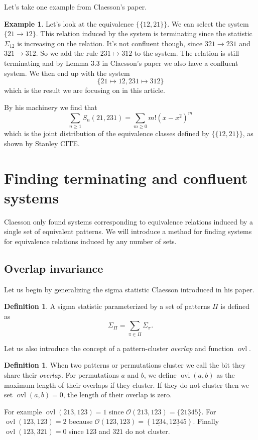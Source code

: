 \documentclass[a4paper, 11pt, english]{article}
\newcommand{\patternrule}{ \mapsto \!}
\theoremstyle{definition}
\newtheorem{definition}[theorem]{Definition}
\newtheorem{example}[theorem]{Example}
\newcommand{\Sym}{S}
\newcommand{\Ocal}{\mathcal{O}}
\DeclareMathOperator{\ovl}{ovl}
\begin{document}
Let's take one example from Claesson's paper.
\begin{example}
    Let's look at the equivalence $\{ \{ 12, 21 \} \}$. We can select the system $\{
        21 \to 12 \}$. This relation induced by the system is terminating since the statistic
    $\Sigma_{12}$ is increasing on the relation. It's not
    confluent though, since $321 \to 231$ and $321 \to 312$. So we add the rule
    $231 \patternrule 312$ to the system. The relation is still terminating and by Lemma
    3.3 in Claesson's paper we also have a confluent system. We then end up with
    the system 
    \[
        \{ 21 \patternrule 12, 231 \patternrule 312 \}
    \]
    which is the result we are focusing on in this article.

    By his machinery we find that 
    \[
        \sum_{n \geq 1} \Sym_n(21, 231) = \sum_{m \geq 0} m!(x-x^2)^m
    \]
    which is the joint distribution of the equivalence classes defined by 
    $\{ \{ 12, 21 \} \}$, as shown by Stanley CITE.
\end{example}

\section{Finding terminating and confluent systems}
Claesson only found systems corresponding to equivalence relations induced by a
single set of equivalent patterns. We will introduce a method for finding
systems for equivalence relations induced by any number of sets.

\subsection{Overlap invariance}
Let us begin by generalizing the sigma statistic Claesson introduced in his paper.

\begin{definition}
    A sigma statistic parameterized by a set of patterns $\Pi$ is defined as
    $$
        \Sigma_\Pi = \sum_{\pi \in \Pi} \Sigma_{\pi}.
    $$
\end{definition}

Let us also introduce the concept of a pattern-cluster \emph{overlap} and function $\ovl$.

\begin{definition}
  When two patterns or permutations cluster we call the bit they share their \emph{overlap}.
  For permutations $a$ and $b$, we define $\ovl(a,b)$ as the maximum length of their overlaps if they 
  cluster. If they do not cluster then we set $\ovl(a,b)=0$, the length of their overlap is zero.

  For example $\ovl(213, 123) = 1$ since $\Ocal(213, 123) = \{ 21\underline{3}45 \}$. For $\ovl(123, 123) = 2$
  because $\Ocal(123, 123) = \left\{ 1\underline{23}4, 12\underline{3}45 \right\}$. Finally
  $\ovl(123, 321)=0$ since $123$ and $321$ do not cluster.
\end{definition}
\end{document}
